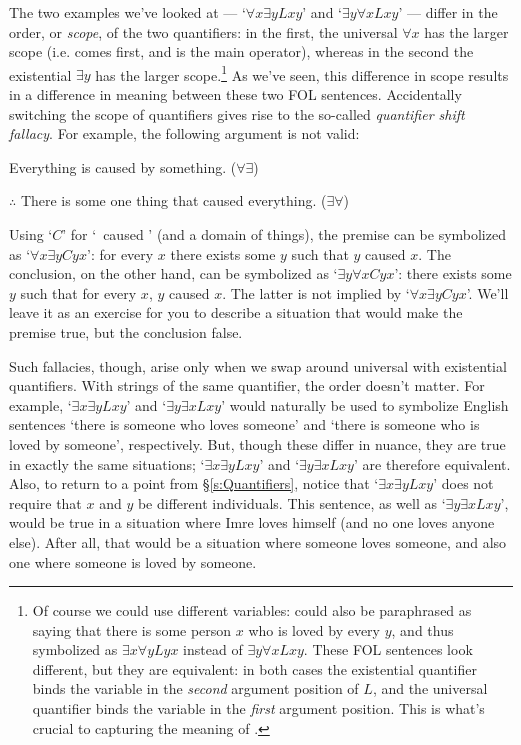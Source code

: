 The two examples we've looked at ---  `$\forall x \exists yLxy$' and `$\exists y\forall xLxy$' --- differ in the order, or \emph{scope}, of the two quantifiers: in the first, the universal $\forall x$ has the larger scope (i.e. comes first, and is the main operator), whereas in the second the existential $\exists y$ has the larger scope.\footnote{Of course we could use different variables:  could also be paraphrased as saying that there is some person $x$ who is loved by every $y$, and thus symbolized as $\exists x\forall y Lyx$ instead of $\exists y\forall xLxy$.  These FOL sentences look different, but they are equivalent: in both cases the existential quantifier binds the variable in the \emph{second} argument position of $L$, and the universal quantifier binds the variable in the \emph{first} argument position.  This is what's crucial to capturing the meaning of .}  As we've seen, this difference in scope results in a difference in meaning between these two FOL sentences.  Accidentally switching the scope of quantifiers gives rise to the so-called \emph{quantifier shift fallacy}.  For example, the following argument is not valid:
	\begin{earg}
		\item[] Everything is caused by something. \hfill ($\forall \exists$)
		\item[$\therefore$] There is some one thing that caused everything. \hfill ($\exists \forall$)
	\end{earg}
Using `$C$' for `\blank\ caused \blank' (and a domain of things), the premise can be symbolized as `$\forall x \exists yCyx$': for every $x$ there exists some $y$ such that $y$ caused $x$.  The conclusion, on the other hand, can be symbolized as `$\exists y \forall xCyx$': there exists some $y$ such that for every $x$, $y$ caused $x$.  The latter is not implied by `$\forall x \exists yCyx$'.  We'll leave it as an exercise for you to describe a situation that would make the premise true, but the conclusion false.


Such fallacies, though, arise only when we swap around universal with existential quantifiers. With strings of the same quantifier, the order doesn't matter.  For example, `$\exists x \exists y Lxy$' and `$\exists y \exists x Lxy$' would naturally be used to symbolize English sentences `there is someone who loves someone' and `there is someone who is loved by someone', respectively. But, though these differ in nuance, they are true in exactly the same situations; `$\exists x \exists y Lxy$' and `$\exists y \exists x Lxy$' are therefore equivalent.  Also, to return to a point from \S\ref{s:Quantifiers}, notice that `$\exists x \exists y Lxy$' does not require that $x$ and $y$ be different individuals.  This sentence, as well as `$\exists y \exists x Lxy$',  would be true in a situation where Imre loves himself (and no one loves anyone else).  After all, that would be a situation where someone loves someone, and also one where someone is loved by someone.


